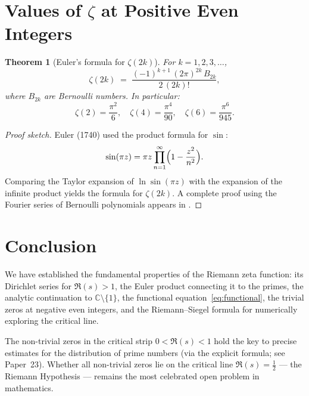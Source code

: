 \documentclass[12pt,a4paper]{amsart}
\newtheorem{theorem}{Theorem}[section]
\theoremstyle{definition}
\newcommand{\C}{\mathbb{C}}
\begin{document}
\section{Values of \texorpdfstring{$\zeta$}{zeta} at Positive Even Integers}

\begin{theorem}[Euler's formula for $\zeta(2k)$]
\label{thm:euler_values}
For $k = 1, 2, 3, \ldots$,
\[
  \zeta(2k) \;=\; \frac{(-1)^{k+1}\,(2\pi)^{2k}\,B_{2k}}{2\,(2k)!},
\]
where $B_{2k}$ are Bernoulli numbers.  In particular:
\[
  \zeta(2) = \frac{\pi^2}{6}, \quad
  \zeta(4) = \frac{\pi^4}{90}, \quad
  \zeta(6) = \frac{\pi^6}{945}.
\]
\end{theorem}

\begin{proof}[Proof sketch]
Euler (1740) used the product formula for $\sin$:
\[
  \sin(\pi z) = \pi z \prod_{n=1}^{\infty}\Bigl(1 - \frac{z^2}{n^2}\Bigr).
\]
Comparing the Taylor expansion of $\ln\sin(\pi z)$ with the expansion of
the infinite product yields the formula for $\zeta(2k)$.
A complete proof using the Fourier series of Bernoulli polynomials appears
in \cite{Apostol1976}.
\end{proof}

\section{Conclusion}

We have established the fundamental properties of the Riemann zeta function:
its Dirichlet series for $\Re(s) > 1$, the Euler product connecting it to
the primes, the analytic continuation to $\C \setminus \{1\}$, the
functional equation~\eqref{eq:functional}, the trivial zeros at negative
even integers, and the Riemann--Siegel formula for numerically exploring
the critical line.

The non-trivial zeros in the critical strip $0 < \Re(s) < 1$ hold the
key to precise estimates for the distribution of prime numbers (via the
explicit formula; see Paper~23).  Whether all non-trivial zeros lie on
the critical line $\Re(s) = \tfrac{1}{2}$ --- the Riemann Hypothesis ---
remains the most celebrated open problem in mathematics.
\end{document}

